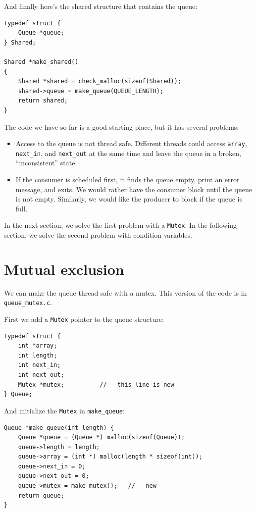 \documentclass[12pt]{book}
\begin{document}
{And finally here's the shared structure that contains the queue:

\begin{verbatim}
typedef struct {
    Queue *queue;
} Shared;

Shared *make_shared()
{
    Shared *shared = check_malloc(sizeof(Shared));
    shared->queue = make_queue(QUEUE_LENGTH);
    return shared;
}
\end{verbatim}

The code we have so far is a good starting place, but it has
several problems:

\begin{itemize}

\item Access to the queue is not thread safe.  Different threads
could access {\tt array}, \verb"next_in", and \verb"next_out"
at the same time and leave the queue in a broken, ``inconsistent''
state.

\item If the consumer is scheduled first, it finds the queue empty,
print an error message, and exits.  We would rather have the consumer
block until the queue is not empty.  Similarly, we would like the
producer to block if the queue is full.

\end{itemize}

In the next section, we solve the first problem with a {\tt Mutex}.
In the following section, we solve the second problem with condition
variables.


\section{Mutual exclusion}

We can make the queue thread safe with a mutex.  This version
of the code is in \verb"queue_mutex.c".

First we add a {\tt Mutex} pointer to the queue structure:

\begin{verbatim}
typedef struct {
    int *array;
    int length;
    int next_in;
    int next_out;
    Mutex *mutex;          //-- this line is new
} Queue;
\end{verbatim}

And initialize the {\tt Mutex} in \verb"make_queue":

\begin{verbatim}
Queue *make_queue(int length) {
    Queue *queue = (Queue *) malloc(sizeof(Queue));
    queue->length = length;
    queue->array = (int *) malloc(length * sizeof(int));
    queue->next_in = 0;
    queue->next_out = 0;
    queue->mutex = make_mutex();   //-- new
    return queue;
}
\end{verbatim}

}
\end{document}

